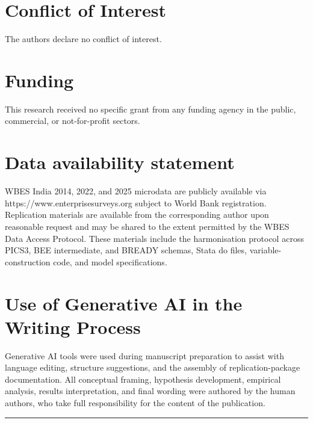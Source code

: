 \documentclass[
  12pt]{article}
\begin{document}
\hypertarget{conflict-of-interest}{%
\section{Conflict of Interest}\label{conflict-of-interest}}

The authors declare no conflict of interest.

\hypertarget{funding}{%
\section{Funding}\label{funding}}

This research received no specific grant from any funding agency in the
public, commercial, or not-for-profit sectors.

\hypertarget{data-availability-statement}{%
\section{Data availability
statement}\label{data-availability-statement}}

WBES India 2014, 2022, and 2025 microdata are publicly available via
https://www.enterprisesurveys.org subject to World Bank registration.
Replication materials are available from the corresponding author upon
reasonable request and may be shared to the extent permitted by the WBES
Data Access Protocol. These materials include the harmonisation protocol
across PICS3, BEE intermediate, and BREADY schemas, Stata do files,
variable-construction code, and model specifications.

\hypertarget{use-of-generative-ai-in-the-writing-process}{%
\section{Use of Generative AI in the Writing
Process}\label{use-of-generative-ai-in-the-writing-process}}

Generative AI tools were used during manuscript preparation to assist
with language editing, structure suggestions, and the assembly of
replication-package documentation. All conceptual framing, hypothesis
development, empirical analysis, results interpretation, and final
wording were authored by the human authors, who take full responsibility
for the content of the publication.

\begin{center}\rule{0.5\linewidth}{0.5pt}\end{center}
\end{document}
